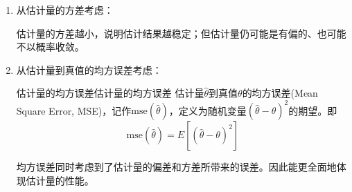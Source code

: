 \begin{enumerate}
\begin{tcbnote}
                    \begin{center}
                    \end{center}
                \end{tcbnote}

            \item 从估计量的方差考虑：
            
                估计量的方差越小，说明估计结果越稳定；但估计量仍可能是有偏的、也可能不以概率收敛。


            \item 从估计量到真值的均方误差考虑：
                \begin{definition}{估计量的均方误差}{估计量的均方误差}
                    估计量$\hat{\theta}$到真值$\theta$的均方误差(Mean Square Error, MSE)，记作$\mathrm{mse}\left(\hat{\theta}\right)$，定义为随机变量$(\hat{\theta}-\theta)^2$的期望。即
                    \begin{equation}
                        \mathrm{mse}\left(\hat{\theta}\right)=E\left[(\hat{\theta}-\theta)^2\right]
                    \end{equation}
                \end{definition}

                均方误差同时考虑到了估计量的偏差和方差所带来的误差。因此能更全面地体现估计量的性能。

        \end{enumerate}

